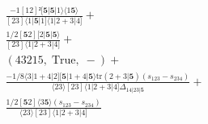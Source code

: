 \documentclass[varwidth, border=5pt]{standalone}
\newcommand{\tr}{\text{tr}}
\begin{document}
\begin{my}
$\begin{gathered}
\scriptscriptstyle\frac{-1[12]²[𝟓|𝟓|1⟩⟨1𝟓⟩}{[23]⟨1|𝟓|1]⟨1|2+3|4]} +\\
\scriptscriptstyle\frac{1/2[𝟓2][2|𝟓|𝟓⟩}{[23]⟨1|2+3|4]} +\\
\scriptscriptstyle(43215,\;\text{True},\;-) +\\
\scriptscriptstyle\frac{-1/8⟨3|1+4|2][𝟓|1+4|𝟓⟩\tr(2+3|𝟓)(s_{123}-s_{234})}{⟨23⟩[23]⟨1|2+3|4]Δ_{14|23|𝟓}} +\\
\scriptscriptstyle\frac{1/2[𝟓2]⟨3𝟓⟩(s_{123}-s_{234})}{⟨23⟩[23]⟨1|2+3|4]} \phantom{+}
\end{gathered}$
\end{my}
\end{document}
